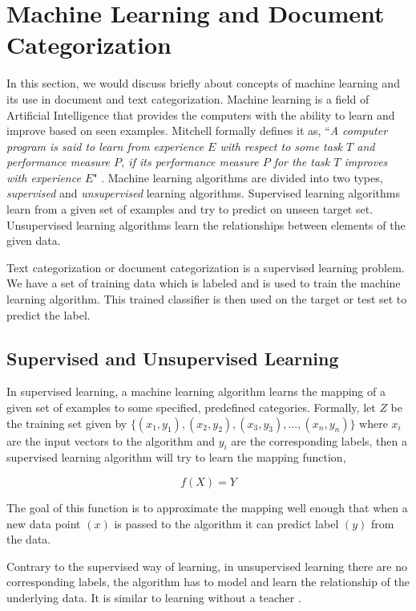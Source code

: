 \section{Machine Learning and Document Categorization}
In this section, we would discuss briefly about concepts of machine learning and its use in document and text categorization.  Machine learning is a field of Artificial Intelligence that provides the computers with the ability to learn and improve based on seen examples. Mitchell formally defines it as, ``\textit{A computer program is said to learn from experience $E$ with respect to some task $T$ and performance measure $P$, if its performance measure $P$ for the task $T$ improves with experience $E$}" \cite{Mitchell:1997:ML:541177}. Machine learning algorithms are divided into two types, \textit{supervised} and \textit{unsupervised} learning algorithms. Supervised learning algorithms learn from a given set of examples and try to predict on unseen target set. Unsupervised learning algorithms learn the relationships between elements of the given data. 

Text categorization or document categorization is a supervised learning problem. We have a set of training data which is labeled and is used to train the machine learning algorithm. This trained classifier is then used on the target or test set to predict the label.

\subsection{Supervised and Unsupervised Learning}
In supervised learning, a machine learning algorithm learns the mapping of a given set of examples to some specified, predefined categories. Formally, let $Z$ be the training set given by $\{(x_{1},y_{1}), (x_{2},y_{2}), (x_{3},y_{3}),...,(x_{n},y_{n})\}$ where $x_{i}$ are the input vectors to the algorithm and $y_{i}$ are the corresponding labels, then a supervised learning algorithm will try to learn the mapping function,

\begin{equation}
    f(X)  = Y
\end{equation}

The goal of this function is to approximate the mapping well enough that when a new data point $(x)$ is passed to the algorithm it can predict label $(y)$ from the data.

Contrary to the supervised way of learning, in unsupervised learning there are no corresponding labels, the algorithm has to model and learn the relationship of the underlying data. It is similar to learning without a teacher \cite{hinton1999unsupervised}.  

